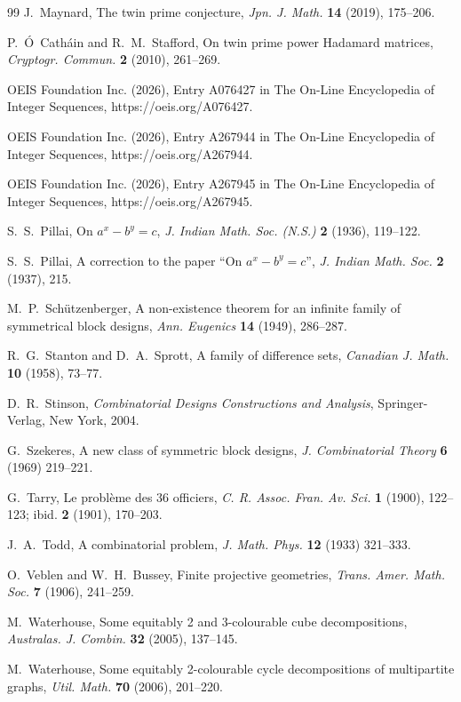 \documentclass[12pt]{article}
\theoremstyle{definition}
\begin{document}
\begin{thebibliography}{99}
J.~Maynard, The twin prime conjecture, \emph{Jpn. J. Math.} \textbf{14} (2019), 175--206.


P.~Ó~Catháin and R.~M.~Stafford, On twin prime power Hadamard matrices, \emph{Cryptogr. Commun.} \textbf{2} (2010), 261--269.

OEIS Foundation Inc. (2026), Entry A076427 in The On-Line Encyclopedia of Integer Sequences, https://oeis.org/A076427.

OEIS Foundation Inc. (2026), Entry A267944 in The On-Line Encyclopedia of Integer Sequences, https://oeis.org/A267944.

OEIS Foundation Inc. (2026), Entry A267945 in The On-Line Encyclopedia of Integer Sequences, https://oeis.org/A267945.

S.~S.~Pillai, On $a^x - b^y = c$, \emph{J. Indian Math. Soc. (N.S.)} \textbf{2} (1936), 119--122.

S.~S.~Pillai, A correction to the paper ``On $a^x - b^y = c$'', \emph{J. Indian Math. Soc.} \textbf{2} (1937), 215.

M.~P.~Schützenberger, A non-existence theorem for an infinite family of symmetrical block designs, \emph{Ann. Eugenics} \textbf{14} (1949), 286--287.

R.~G.~Stanton and D.~A.~Sprott, A family of difference sets, \emph{Canadian J. Math.} \textbf{10} (1958), 73--77.

D.~R.~Stinson, \emph{Combinatorial Designs Constructions and Analysis}, Springer-Verlag, New York, 2004.

G.~Szekeres, A new class of symmetric block designs, \emph{J. Combinatorial Theory} \textbf{6} (1969) 219--221.

G.~Tarry, Le problème des 36 officiers, \emph{C. R. Assoc. Fran. Av. Sci.} \textbf{1} (1900), 122--123; ibid. \textbf{2} (1901), 170--203.

J.~A.~Todd, A combinatorial problem, \emph{J. Math. Phys.} \textbf{12} (1933) 321--333.

O.~Veblen and W.~H.~Bussey, Finite projective geometries, \emph{Trans. Amer. Math. Soc.} \textbf{7} (1906), 241--259.

M.~Waterhouse, Some equitably 2 and 3-colourable cube decompositions, \emph{Australas. J. Combin.} \textbf{32} (2005), 137--145.

M.~Waterhouse, Some equitably 2-colourable cycle decompositions of multipartite graphs, \emph{Util. Math.} \textbf{70} (2006), 201--220.

\end{thebibliography}
\end{document}
